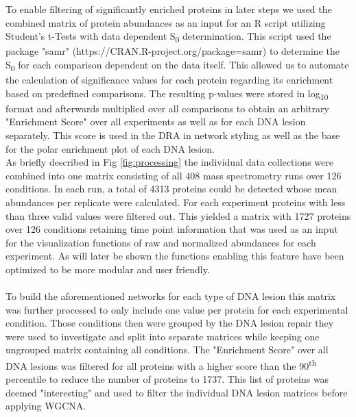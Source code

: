 To enable filtering of significantly enriched proteins in later steps we used the combined matrix of protein abundances as an input for an R script utilizing Student's t-Tests with data dependent S\textsubscript{0} determination. This script used the package "samr" (https://CRAN.R-project.org/package=samr) to determine the S\textsubscript{0} for each comparison dependent on the data itself. This allowed us to automate the calculation of significance values for each protein regarding its enrichment based on predefined comparisons. The resulting p-values were stored in log\textsubscript{10} format and afterwards multiplied over all comparisons to obtain an arbitrary "Enrichment Score" over all experiments as well as for each DNA lesion separately. This score is used in the DRA in network styling as well as the base for the polar enrichment plot of each DNA lesion.\\  
As briefly described in Fig \ref{fig:processing} the individual data collections were combined into one matrix consisting of all 408 mass spectrometry runs over 126 conditions. In each run, a total of 4313 proteins could be detected whose mean abundances per replicate were calculated. For each experiment proteins with less than three valid values were filtered out.  This yielded a matrix with 1727 proteins over 126 conditions retaining time point information that was used as an input for the visualization functions of raw and normalized abundances for each experiment. As will later be shown the functions enabling this feature have been optimized to be more modular and user friendly.\\\\
To build the aforementioned networks for each type of DNA lesion this matrix was further processed to only include one value per protein for each experimental condition. Those conditions then were grouped by the DNA lesion repair they were used to investigate and split into separate matrices while keeping one ungrouped matrix containing all conditions. The "Enrichment Score" over all DNA lesions was filtered for all proteins with a higher score than the 90\textsuperscript{th} percentile to reduce the number of proteins to 1737. This list of proteins was deemed "interesting" and used to filter the individual DNA lesion matrices before applying WGCNA.\\


